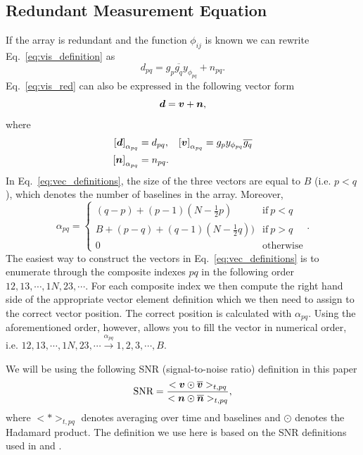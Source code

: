 \documentclass[useAMS,usenatbib]{mn2e}
\newcommand{\bd}{\bmath{d}}
\newcommand{\bv}{\bmath{v}}
\newcommand{\bn}{\bmath{n}}
\newcommand{\conj}[1]{\overline{#1}}
\begin{document}
\subsection{Redundant Measurement Equation}
If the array is redundant and the function $\phi_{ij}$ is known we can rewrite Eq.~\eqref{eq:vis_definition} as
\begin{equation}
\label{eq:vis_red}
d_{pq} = g_{p}\conj{g_q}y_{\phi_{pq}} + n_{pq}.
\end{equation}
Eq.~\eqref{eq:vis_red} can also be expressed in the following vector form 
\begin{equation}
\label{eq:vis_red_vec}
\bd = \bv + \bn, 
\end{equation}
where 
\begin{align}
 \left [ \bd \right]_{\alpha_{pq}} &= d_{pq}, & \left [ \bv \right ]_{\alpha_{pq}} &= g_p y_{\phi_{pq}} \conj{g_q}\nonumber\\
 \left [ \bn \right ]_{\alpha_{pq}} &= n_{pq}. &  &\label{eq:vec_definitions}
\end{align}
In Eq.~\eqref{eq:vec_definitions}, the size of the three vectors are equal to $B$ (i.e. $p<q$), which denotes the number of baselines in the array. Moreover,
\begin{equation}
\alpha_{pq} =
\begin{cases}
(q-p) + (p-1)\left (N-\frac{1}{2}p \right ) & \textrm{if}~p<q\\
B + (p-q) + (q-1)\left (N-\frac{1}{2}q \right )) & \textrm{if}~p>q\\
0 & \textrm{otherwise}
\end{cases}.
\end{equation}
The easiest way to construct the vectors in Eq.~\ref{eq:vec_definitions} is to enumerate through the composite indexes $pq$ in the following order $12, 13,\cdots,1N,23,\cdots$.
For each composite index we then compute the right hand side of the appropriate vector element definition which we then need to assign to the 
correct vector position. The correct position is calculated with $\alpha_{pq}$. Using the aforementioned order, however, allows you to fill the vector in numerical order, i.e. $12,13,\cdots,1N,23,\cdots \xrightarrow{\alpha_{pq}} 1,2,3,\cdots,B$.  


We will be using the following SNR (signal-to-noise ratio) definition in this paper  
\begin{equation}
\textrm{SNR} = \frac{<\bv\odot\conj{\bv}>_{t,pq}}{<\bn\odot\conj{\bn}>_{t,pq}}, 
\end{equation}
where $<*>_{t,pq}$ denotes averaging over time and baselines and $\odot$ denotes the Hadamard product. The definition we use here is based on the SNR definitions used in \citet{Liu2010} and \citet{Marthi2014}.
\end{document}

